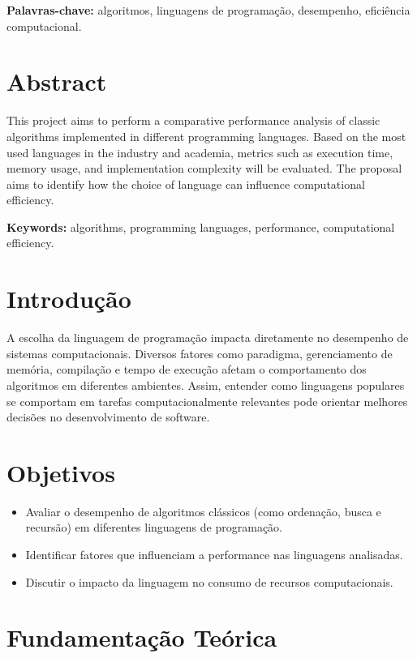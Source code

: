 \documentclass[12pt,oneside,a4paper]{report}
\begin{document}
\textbf{Palavras-chave:} algoritmos, linguagens de programação, desempenho, eficiência computacional.

\chapter*{Abstract}
This project aims to perform a comparative performance analysis of classic algorithms implemented in different programming languages. Based on the most used languages in the industry and academia, metrics such as execution time, memory usage, and implementation complexity will be evaluated. The proposal aims to identify how the choice of language can influence computational efficiency.

\textbf{Keywords:} algorithms, programming languages, performance, computational efficiency.

\tableofcontents

\chapter{Introdução}
A escolha da linguagem de programação impacta diretamente no desempenho de sistemas computacionais. Diversos fatores como paradigma, gerenciamento de memória, compilação e tempo de execução afetam o comportamento dos algoritmos em diferentes ambientes. Assim, entender como linguagens populares se comportam em tarefas computacionalmente relevantes pode orientar melhores decisões no desenvolvimento de software.

\chapter{Objetivos}
\begin{itemize}
    \item Avaliar o desempenho de algoritmos clássicos (como ordenação, busca e recursão) em diferentes linguagens de programação.
    \item Identificar fatores que influenciam a performance nas linguagens analisadas.
    \item Discutir o impacto da linguagem no consumo de recursos computacionais.
\end{itemize}

\chapter{Fundamentação Teórica}
\end{document}
